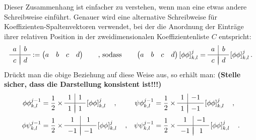%
Dieser Zusammenhang ist einfacher zu verstehen, wenn man eine etwas andere Schreibweise einführt. Genauer wird eine alternative Schreibweise für Koeffizienten-Spaltenvektoren verwendet, bei der die Anordnung der Einträge ihrer relativen Position in der zweidimensionalen Koeffizientenliste $C$ entspricht:
%
\[
\begin{array}{c|c}
a & b \\[.05cm] 
\hline \\[-0.35cm]
c & d
\end{array}
:=
\begin{pmatrix}
a & b & c & d
\end{pmatrix}
\qquad \mbox{, sodass} \qquad
\begin{pmatrix}
a & b & c & d
\end{pmatrix}
\left[ \phi\phi \right]_{k,l}^j
=
\begin{array}{c|c}
a & b \\[.05cm] 
\hline \\[-0.35cm]
c & d
\end{array}
\left[ \phi\phi \right]_{k,l}^j
.
\]
%
Drückt man die obige Beziehung auf diese Weise aus, so erhält man: \textbf{(Stelle sicher, dass die Darstellung konsistent ist!!!)}
%
\begin{align*}
\phi\phi_{k,l}^{j-1} &=
\frac{1}{2} \times
\begin{array}{c|c}
1 & 1 \\[.05cm] 
\hline \\[-0.35cm]
1 & 1
\end{array}
\left[ \phi\phi \right]_{k,l}^j
\quad , &
\psi\phi_{k,l}^{j-1} &=
\frac{1}{2} \times
\begin{array}{c|c}
1 & -1 \\[.05cm] 
\hline \\[-0.35cm]
1 & -1
\end{array}
\left[ \phi\phi \right]_{k,l}^j
\quad , \\
\phi\psi_{k,l}^{j-1} &=
\frac{1}{2} \times
\begin{array}{c|c}
1 & 1 \\[.05cm] 
\hline \\[-0.35cm]
-1 & -1
\end{array}
\left[ \phi\phi \right]_{k,l}^j
\quad , &
\psi\psi_{k,l}^{j-1} &=
\frac{1}{2} \times
\begin{array}{c|c}
1 & -1 \\[.05cm] 
\hline \\[-0.35cm]
-1 & 1
\end{array}
\left[ \phi\phi \right]_{k,l}^j
\quad .
\end{align*}
